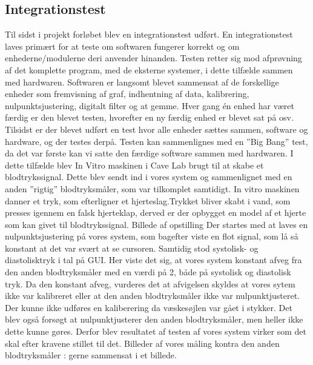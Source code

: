 \subsection{Integrationstest}
Til sidst i projekt forløbet blev en integrationstest udført. En integrationstest laves primært for at teste om softwaren fungerer korrekt og om enhederne/modulerne deri anvender hinanden. Testen retter sig mod afprøvning af det komplette program, med de eksterne systemer, i dette tilfælde sammen med hardwaren. 
Softwaren er langsomt blevet sammensat af de forskellige enheder som fremvisning af graf, indhentning af data, kalibrering, nulpunktsjustering, digitalt filter og at gemme. Hver gang én enhed har været færdig er den blevet testen, hvorefter en ny færdig enhed er blevet sat på osv. Tilsidst er der blevet udført  en test hvor alle enheder sættes sammen, software og hardware,  og der testes derpå. Testen kan sammenlignes med en ”Big Bang” test, da det var første kan vi satte den færdige software sammen med hardwaren.  
I dette tilfælde blev In Vitro maskinen i Cave Lab brugt til at skabe et blodtrykssignal. Dette blev sendt ind i vores system og sammenlignet med en anden ”rigtig” blodtryksmåler, som var tilkomplet samtidigt.  In vitro maskinen danner et tryk, som efterligner et hjerteslag.Trykket bliver skabt i vand, som presses igennem en falsk hjerteklap, derved er der opbygget en model af et hjerte som kan givet til blodtrykssignal. 
Billede af opstilling
Der startes med at laves en nulpunktsjustering på vores system, som bagefter viste en flot signal, som lå så konstant at det var svært at se cursoren. Samtidig stod systolisk- og diastolisktryk i tal på GUI. Her viste det sig, at vores system konstant afveg fra den anden blodtryksmåler med en værdi på 2, både på systolisk og diastolisk tryk. Da den konstant afveg, vurderes det at afvigelsen skyldes at vores sytem ikke var kalibreret eller at den anden blodtryksmåler ikke var nulpunktjusteret.  Der kunne ikke udføres en kaliberering da væskesøjlen var gået i stykker. Det blev også forsøgt at nulpunktjusterer den anden blodtryksmåler, men heller ikke dette kunne gøres.  Derfor blev resultatet af testen af vores system virker som det skal efter kravene stillet til det.  
Billeder af vores måling kontra den anden blodtryksmåler : gerne sammensat i et billede. 




